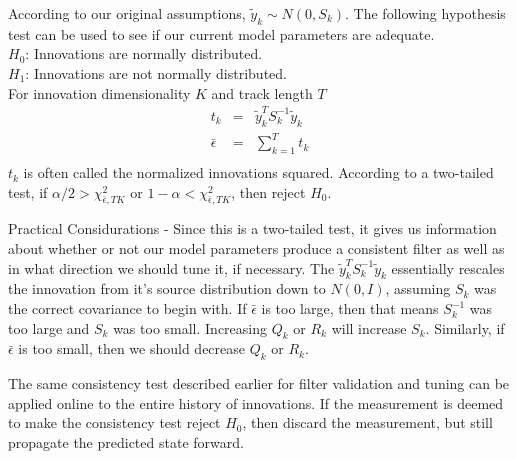 \medskip
{} According to our original assumptions, $\tilde{y}_k \sim N(0, S_k)$.  The following hypothesis test can be used to see if our current model parameters are adequate.\\
$H_0$: Innovations are normally distributed.\\
$H_1$: Innovations are not normally distributed.\\
For innovation dimensionality $K$ and track length $T$
\begin{eqnarray*}
t_k &=& \tilde{y}_k^T S^{-1}_k \tilde{y}_k\\
\bar{\epsilon} &=& \sum_{k=1}^T t_k\\
\end{eqnarray*}
$t_k$ is often called the normalized innovations squared.  According to a two-tailed test, if $\alpha/2 > \chi^2_{\bar{\epsilon}, TK}$ or $1-\alpha < \chi^2_{\bar{\epsilon}, TK}$, then reject $H_0$.

\medskip
\noindent Practical Considurations - Since this is a two-tailed test, it gives us information about whether or not our model parameters produce a consistent filter as well as in what direction we should tune it, if necessary.  The $\tilde{y}_k^T S^{-1}_k \tilde{y}_k$ essentially rescales the innovation from it's source distribution down to $N(0,I)$, assuming $S_k$ was the correct covariance to begin with.  If $\bar{\epsilon}$ is too large, then that means $S^{-1}_k$ was too large and $S_k$ was too small.  Increasing $Q_k$ or $R_k$ will increase $S_k$.  Similarly, if $\bar{\epsilon}$ is too small, then we should decrease $Q_k$ or $R_k$.

\medskip
{} The same consistency test described earlier for filter validation and tuning can be applied online to the entire history of innovations.  If the measurement is deemed to make the consistency test reject $H_0$, then discard the measurement, but still propagate the predicted state forward.
